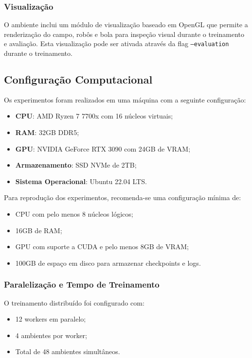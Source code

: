\subsubsection{Visualização}

O ambiente inclui um módulo de visualização baseado em OpenGL que permite a renderização do campo, robôs e bola para inspeção visual durante o treinamento e avaliação. Esta visualização pode ser ativada através da flag \texttt{--evaluation} durante o treinamento.

\subsection{Configuração Computacional}

Os experimentos foram realizados em uma máquina com a seguinte configuração:

\begin{itemize}
    \item \textbf{CPU}: AMD Ryzen 7 7700x com 16 núcleos virtuais;
    \item \textbf{RAM}: 32GB DDR5;
    \item \textbf{GPU}: NVIDIA GeForce RTX 3090 com 24GB de VRAM;
    \item \textbf{Armazenamento}: SSD NVMe de 2TB;
    \item \textbf{Sistema Operacional}: Ubuntu 22.04 LTS.
\end{itemize}

Para reprodução dos experimentos, recomenda-se uma configuração mínima de:

\begin{itemize}
    \item CPU com pelo menos 8 núcleos lógicos;
    \item 16GB de RAM;
    \item GPU com suporte a CUDA e pelo menos 8GB de VRAM;
    \item 100GB de espaço em disco para armazenar checkpoints e logs.
\end{itemize}

\subsubsection{Paralelização e Tempo de Treinamento}

O treinamento distribuído foi configurado com:

\begin{itemize}
    \item 12 workers em paralelo;
    \item 4 ambientes por worker;
    \item Total de 48 ambientes simultâneos.
\end{itemize}

